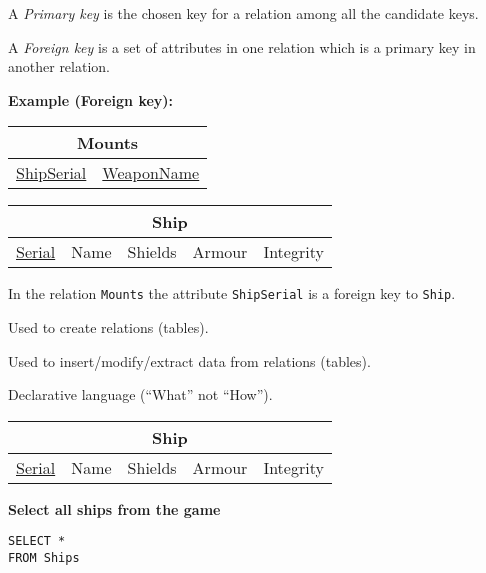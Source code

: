 \documentclass{beamer}
\begin{document}
\begin{slide}{
\item A \textit{Primary key} is the chosen key for a relation among all the candidate keys.
\item A \textit{Foreign key} is a set of attributes in one relation which is a primary key in another relation.

\vspace{0.5cm}
\textbf{Example (Foreign key):}\\

\centering
\begin{tabular}{|c|c|}
\hline
\multicolumn{2}{|c|}{\textbf{Mounts}} \\
\hline
\underline{ShipSerial} & \underline{WeaponName} \\
\hline
\end{tabular}

\vspace{0.2cm}
\begin{tabular}{|c|c|c|c|c|}
\hline
\multicolumn{5}{|c|}{\textbf{Ship}} \\
\hline
\underline{Serial} & Name & Shields & Armour & Integrity \\
\hline
\end{tabular}

\raggedright
\vspace{0.2cm}
In the relation \texttt{Mounts} the attribute \texttt{ShipSerial} is a foreign key to \texttt{Ship}.


}\end{slide}

\begin{slide}{
\item Used to create relations (tables).
\item Used to insert/modify/extract data from relations (tables).
\item Declarative language (``What'' not ``How'').
}\end{slide}

\begin{frame}[fragile]
\begin{tabular}{|c|c|c|c|c|}
\hline
\multicolumn{5}{|c|}{\textbf{Ship}} \\
\hline
\underline{Serial} & Name & Shields & Armour & Integrity \\
\hline
\end{tabular}

\vspace{0.25cm}
\textbf{Select all ships from the game}
\pause
\begin{lstlisting}
SELECT *
FROM Ships
\end{lstlisting}

\end{frame}
\end{document}
